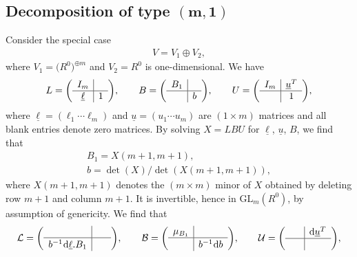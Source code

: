 \documentclass[pdftex]{sigma}%
\numberwithin{equation}{section}
\newcommand{\GL}{\mathrm{GL}}
\newcommand{\mc}{\mu}
\newcommand{\0}{\color{blue}{\mathsf{0}}}
\begin{document}
\subsection[Decomposition of type (m,1)]{Decomposition of type $\boldsymbol{(m,1)}$}
Consider the special case
\begin{gather*}
V= V_1 \oplus V_2,
\end{gather*}
where $V_1 = \big(R^0\big)^{\oplus m}$ and $V_2 = R^0$ is one-dimensional.
We have
\begin{gather*}
L= \left(\begin{array}{c|c}
 I_m & \\ \hline
 \underline{\ell} & 1 \\
\end{array}\right)\!, \qquad
B= \left(\begin{array}{c|c}
 B_1 & \\ \hline
 & b \\
\end{array}\right)\!, \qquad
U= \left(\begin{array}{c|c}
 I_m & \underline{u}^T \\
 \hline
 & 1 \\
\end{array}\right)\!,
\end{gather*}
where $\underline{\ell}=(\ell_1 \cdots \ell_m)$ and $\underline{u}= (u_1\cdots u_m)$ are $(1 \times m)$ matrices and all blank entries denote zero matrices.
By solving $X=LBU$ for $\underline{\ell}$, $\underline{u}$, $B$, we find that
\begin{gather}
B_1 = X(m+1,m+1), \nonumber
\\
b = \det(X)/ \det(X(m+1,m+1)),\label{B1asXminor}
\end{gather}
where $X(m+1,m+1)$ denotes the $(m\times m)$ minor of $X$ obtained by deleting row $m+1$ and column $m+1$. It is invertible, hence in $\GL_{m}(R^0)$, by assumption of genericity.
We find that
\begin{gather*}
\mathcal{L} = \left(
\begin{array}{c|c}
 & \quad \\ \hline
 b^{-1^{\vphantom{1}}} {\rm d} \underline{\ell}. B_1 &
\end{array}
\right)\!,
 \qquad \mathcal{B} = \left(
\begin{array}{c|c}
 \mc_{B_1} & \\ \hline
 & b^{-1^{\vphantom{1}}} {\rm d}b
\end{array}
\right)\!, \qquad
\mathcal{U} = \left(
\begin{array}{c|c}
\quad & {\rm d}\underline{u}^T \\
 \hline
 & \\
\end{array}
\right)\!,
\end{gather*}
\end{document}
